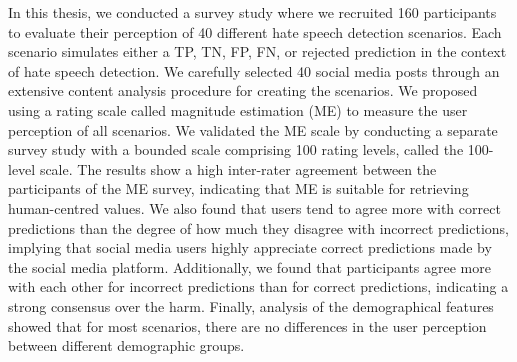 %
In this thesis, we conducted a survey study where we recruited 160 participants to evaluate their perception of 40 different hate speech detection scenarios.
%
Each scenario simulates either a TP, TN, FP, FN, or rejected prediction in the context of hate speech detection.
%
We carefully selected 40 social media posts through an extensive content analysis procedure for creating the scenarios.
%
We proposed using a rating scale called magnitude estimation (ME) to measure the user perception of all scenarios.
%
We validated the ME scale by conducting a separate survey study with a bounded scale comprising 100 rating levels, called the 100-level scale.
%
The results show a high inter-rater agreement between the participants of the ME survey, indicating that ME is suitable for retrieving human-centred values.
%
We also found that users tend to agree more with correct predictions than the degree of how much they disagree with incorrect predictions, implying that social media users highly appreciate correct predictions made by the social media platform.
%
Additionally, we found that participants agree more with each other for incorrect predictions than for correct predictions, indicating a strong consensus over the harm.
%
Finally, analysis of the demographical features showed that for most scenarios, there are no differences in the user perception between different demographic groups.
%

